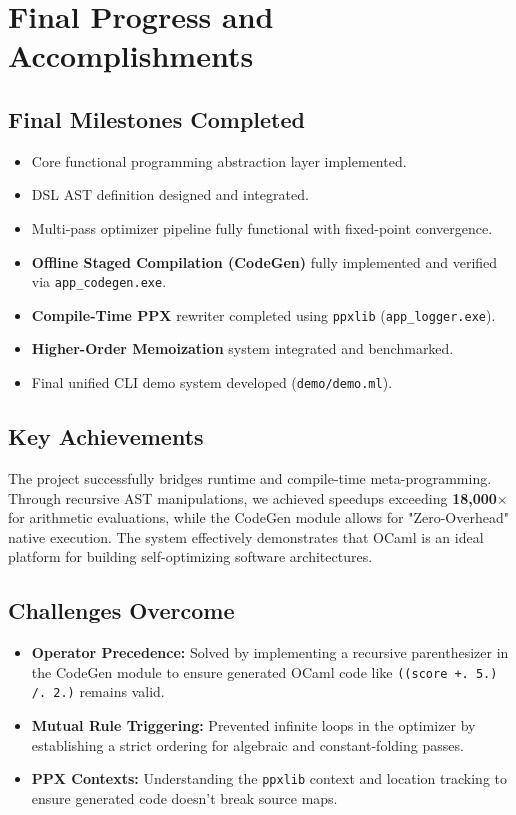 \documentclass[12pt]{article}
\begin{document}
\section{Final Progress and Accomplishments}

\subsection*{Final Milestones Completed}
\begin{itemize}
    \item Core functional programming abstraction layer implemented.
    \item DSL AST definition designed and integrated.
    \item Multi-pass optimizer pipeline fully functional with fixed-point convergence.
    \item \textbf{Offline Staged Compilation (CodeGen)} fully implemented and verified via \texttt{app\_codegen.exe}.
    \item \textbf{Compile-Time PPX} rewriter completed using \texttt{ppxlib} (\texttt{app\_logger.exe}).
    \item \textbf{Higher-Order Memoization} system integrated and benchmarked.
    \item Final unified CLI demo system developed (\texttt{demo/demo.ml}).
\end{itemize}

\subsection*{Key Achievements}
The project successfully bridges runtime and compile-time meta-programming. Through recursive AST manipulations, we achieved speedups exceeding \textbf{18,000$\times$} for arithmetic evaluations, while the CodeGen module allows for "Zero-Overhead" native execution. The system effectively demonstrates that OCaml is an ideal platform for building self-optimizing software architectures.

\subsection*{Challenges Overcome}
\begin{itemize}
    \item \textbf{Operator Precedence:} Solved by implementing a recursive parenthesizer in the CodeGen module to ensure generated OCaml code like \texttt{((score +. 5.) /. 2.)} remains valid.
    \item \textbf{Mutual Rule Triggering:} Prevented infinite loops in the optimizer by establishing a strict ordering for algebraic and constant-folding passes.
    \item \textbf{PPX Contexts:} Understanding the \texttt{ppxlib} context and location tracking to ensure generated code doesn't break source maps.
\end{itemize}
\end{document}
